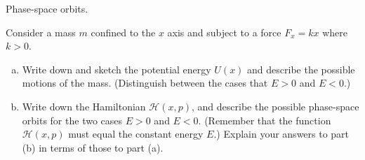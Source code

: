 \documentclass[11pt,letterpaper,boxed]{../hmcpsetrhino}
\def\Ham{\mathcal{H}}
\begin{document}
\begin{problem}[ii]
Phase-space orbits.

\begin{problem}[13.28]
Consider a mass $m$ confined to the $x$ axis and subject to a force $F_x = kx$ where $k > 0$. 
\begin{enumerate}[(a)]
\item Write down and sketch the potential energy $U(x)$ and describe the possible motions of the mass. (Distinguish between the cases that $E>0$ and $E<0$.)

\item Write down the Hamiltonian $\Ham (x,p)$, and describe the possible phase-space orbits for the two cases $E> 0$ and $E<0$. (Remember that the function $\Ham (x,p)$ must equal the constant energy $E$.) Explain your answers to part (b) in terms of those  to part (a).

\end{enumerate}
\end{problem}
\end{problem}
\begin{solution}


\vfill
\end{solution}
\end{document}
